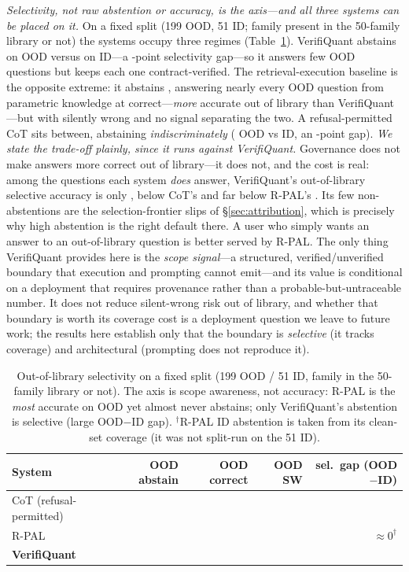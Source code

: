 \emph{Selectivity, not raw abstention or accuracy, is the axis---and all three systems can be placed on it.}
On a fixed split (199 OOD, 51 ID; family present in the 50-family library or not) the systems occupy three regimes (Table~\ref{tab:oodsel}).
VerifiQuant abstains \oodVQabsOOD{} on OOD versus \oodVQabsID{} on ID---a \oodVQgap{}-point selectivity gap---so it answers few OOD questions but keeps each one contract-verified.
The retrieval-execution baseline is the opposite extreme: it abstains \oodRPALabsOOD{}, answering nearly every OOD question from parametric knowledge at \oodRPALcorrOOD{} correct---\emph{more} accurate out of library than VerifiQuant---but with \oodRPALswOOD{} silently wrong and no signal separating the two.
A refusal-permitted CoT sits between, abstaining \emph{indiscriminately} (\oodCoTabsOOD{} OOD vs \oodCoTabsID{} ID, an \oodCoTgap{}-point gap).
\emph{We state the trade-off plainly, since it runs against VerifiQuant.}
Governance does not make answers more correct out of library---it does not, and the cost is real: among the questions each system \emph{does} answer, VerifiQuant's out-of-library selective accuracy is only \oodVQselOOD{}, below CoT's \oodCoTselOOD{} and far below R-PAL's \oodRPALselOOD{}.
Its few non-abstentions are the selection-frontier slips of \S\ref{sec:attribution}, which is precisely why high abstention is the right default there.
A user who simply wants an answer to an out-of-library question is better served by R-PAL.
The only thing VerifiQuant provides here is the \emph{scope signal}---a structured, verified/unverified boundary that execution and prompting cannot emit---and its value is conditional on a deployment that requires provenance rather than a probable-but-untraceable number.
It does not reduce silent-wrong risk out of library, and whether that boundary is worth its coverage cost is a deployment question we leave to future work; the results here establish only that the boundary is \emph{selective} (it tracks coverage) and architectural (prompting does not reproduce it).

\begin{table}[t]
\caption{Out-of-library selectivity on a fixed split (199 OOD / 51 ID, family in the 50-family library or not).
The axis is scope awareness, not accuracy: R-PAL is the \emph{most} accurate on OOD yet almost never abstains; only VerifiQuant's abstention is selective (large OOD$-$ID gap).
$^{\dagger}$R-PAL ID abstention is taken from its clean-set coverage (it was not split-run on the 51 ID).}
\label{tab:oodsel}
\small
\begin{tabular}{@{}lrrrr@{}}
\toprule
System & OOD abstain & OOD correct & OOD SW & sel.\ gap (OOD$-$ID) \\
\midrule
CoT (refusal-permitted) & \oodCoTabsOOD{} & \oodCoTans{} & \oodCoTswOOD{} & \oodCoTgap{} \\
R-PAL & \oodRPALabsOOD{} & \oodRPALcorrOOD{} & \oodRPALswOOD{} & ${\approx}0^{\dagger}$ \\
\textbf{VerifiQuant} & \textbf{\oodVQabsOOD{}} & \oodVQcorrOOD{} & \oodVQswOOD{} & \textbf{\oodVQgap{}} \\
\bottomrule
\end{tabular}
\end{table}

